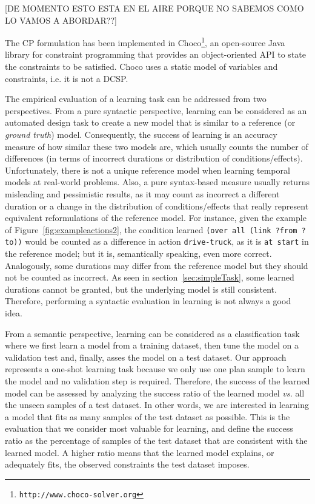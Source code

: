 \documentclass{ecai}
\begin{document}
[DE MOMENTO ESTO ESTA EN EL AIRE PORQUE NO SABEMOS COMO LO VAMOS A ABORDAR??]

The CP formulation has been implemented in \textsf{Choco}\footnote{\texttt{http://www.choco-solver.org}}, an open-source Java library for constraint programming that provides an object-oriented API to state the constraints to be satisfied. \textsf{Choco} uses a static model of variables and constraints, i.e. it is not a DCSP.

The empirical evaluation of a learning task can be addressed from two perspectives. From a pure syntactic perspective, learning can be considered as an automated design task to create a new model that is similar to a reference (or {\em ground truth}) model. Consequently, the success of learning is an accuracy measure of how similar these two models are, which usually counts the number of differences (in terms of incorrect durations or distribution of conditions/effects). Unfortunately, there is not a unique reference model when learning temporal models at real-world problems. Also, a pure syntax-based measure usually returns misleading and pessimistic results, as it may count as incorrect a different duration or a change in the distribution of conditions/effects that really represent equivalent reformulations of the reference model. For instance, given the example of Figure~\ref{fig:exampleactions2}, the condition learned \texttt{(over all (link ?from ?to))} would be counted as a difference in action \texttt{drive-truck}, as it is \texttt{at start} in the reference model; but it is, semantically speaking, even more correct. Analogously, some durations may differ from the reference model but they should not be counted as incorrect. As seen in section~\ref{sec:simpleTask}, some learned durations cannot be granted, but the underlying model is still consistent. Therefore, performing a syntactic evaluation in learning is not always a good idea.

From a semantic perspective, learning can be considered as a classification task where we first learn a model from a training dataset, then tune the model on a validation test and, finally, asses the model on a test dataset. Our approach represents a one-shot learning task because we only use one plan sample to learn the model and no validation step is required.
Therefore, the success of the learned model can be assessed by analyzing the success ratio of the learned model \emph{vs.} all the unseen samples of a test dataset. In other words, we are interested in learning a model that fits as many samples of the test dataset as possible. This is the evaluation that we consider most valuable for learning, and define the success ratio as the percentage of samples of the test dataset that are consistent with the learned model. A higher ratio means that the learned model explains, or adequately fits, the observed constraints the test dataset imposes.
\end{document}
